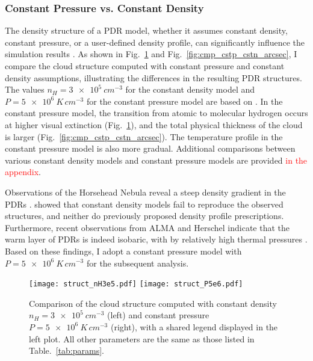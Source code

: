 \documentclass[12pt,a4paper]{article}
\newcommand{\qt}[1]{\textcolor{red}{#1}}
\begin{document}
\subsubsection{Constant Pressure vs. Constant Density} \label{sec:cstnp}

The density structure of a PDR model, whether it assumes constant density, constant pressure, or a user-defined density profile, can significantly influence the simulation results \parencite{Wolfire2022}. As shown in Fig.~\ref{fig:cmp_cstp_cstn} and Fig.~\ref{fig:cmp_cstp_cstn_arcsec}, I compare the cloud structure computed with constant pressure and constant density assumptions, illustrating the differences in the resulting PDR structures. The values $n_H = \qty{3e5}{cm^{-3}}$ for the constant density model and $P = \qty{5e6}{K\,cm^{-3}}$ for the constant pressure model are based on \textcite{Maillard2023}. In the constant pressure model, the transition from atomic to molecular hydrogen occurs at higher visual extinction (Fig.~\ref{fig:cmp_cstp_cstn}), and the total physical thickness of the cloud is larger (Fig.~\ref{fig:cmp_cstp_cstn_arcsec}). The temperature profile in the constant pressure model is also more gradual. Additional comparisons between various constant density models and constant pressure models are provided \qt{in the appendix}.

Observations of the Horsehead Nebula reveal a steep density gradient in the PDRs \parencite{Habart2005,Guzmán2011}. \textcite{HernándezVera2023} showed that constant density models fail to reproduce the observed structures, and neither do previously proposed density profile prescriptions. Furthermore, recent observations from ALMA and Herschel indicate that the warm layer of PDRs is indeed isobaric, with by relatively high thermal pressures \parencite{Marconi1998,Goicoechea2016,Joblin2018,Wu2018,Bron2018,Maillard2021}. Based on these findings, I adopt a constant pressure model with $P = \qty{5e6}{K\,cm^{-3}}$ for the subsequent analysis.

\begin{figure}[ht]
    \centering
    \texttt{[image: struct\_nH3e5.pdf]}
    \texttt{[image: struct\_P5e6.pdf]}
    \caption{Comparison of the cloud structure computed with constant density $n_H = \qty{3e5}{cm^{-3}}$ (left) and constant pressure $P = \qty{5e6}{K\,cm^{-3}}$ (right), with a shared legend displayed in the left plot. All other parameters are the same as those listed in Table.~\ref{tab:params}.} \label{fig:cmp_cstp_cstn}
\end{figure}
\end{document}
